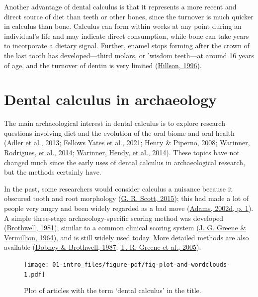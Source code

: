 \documentclass[
  letterpaper,
]{book}
\begin{document}
Another advantage of dental calculus is that it represents a more recent
and direct source of diet than teeth or other bones, since the turnover
is much quicker in calculus than bone. Calculus can form within weeks at
any point during an individual's life and may indicate direct
consumption, while bone can take years to incorporate a dietary signal.
Further, enamel stops forming after the crown of the last tooth has
developed---third molars, or 'wisdom teeth---at around 16 years of age,
and the turnover of dentin is very limited
(\protect\hyperlink{ref-hillsonDentalAnthropology1996}{Hillson, 1996}).

\hypertarget{intro-arch}{%
\section{Dental calculus in archaeology}\label{intro-arch}}

The main archaeological interest in dental calculus is to explore
research questions involving diet and the evolution of the oral biome
and oral health
(\protect\hyperlink{ref-adlerSequencingAncient2013}{Adler et al., 2013};
\protect\hyperlink{ref-yatesOralMicrobiome2021}{Fellows Yates et al.,
2021}; \protect\hyperlink{ref-henryCalculusSyria2008}{Henry \& Piperno,
2008}; \protect\hyperlink{ref-warinnerPathogensHost2014}{Warinner,
Rodrigues, et al., 2014};
\protect\hyperlink{ref-warinnerEvidenceMilk2014}{Warinner, Hendy, et
al., 2014}). These topics have not changed much since the early uses of
dental calculus in archaeological research, but the methods certainly
have.

In the past, some researchers would consider calculus a nuisance because
it obscured tooth and root morphology
(\protect\hyperlink{ref-scottBriefHistory2015}{G. R. Scott, 2015}); this
had made a lot of people very angry and been widely regarded as a bad
move (\protect\hyperlink{ref-adamsRestaurantEnd2002}{Adams, 2002d, p.
1}). A simple three-stage archaeology-specific scoring method was
developed (\protect\hyperlink{ref-brothwellDiggingBones1981}{Brothwell,
1981}), similar to a common clinical scoring system
(\protect\hyperlink{ref-greeneSimplifiedOral1964}{J. G. Greene \&
Vermillion, 1964}), and is still widely used today. More detailed
methods are also available
(\protect\hyperlink{ref-dobneyMethodEvaluating1987}{Dobney \& Brothwell,
1987}; \protect\hyperlink{ref-greeneQuantifyingCalculus2005}{T. R.
Greene et al., 2005}).

\begin{figure}

{\centering \texttt{[image: 01-intro\_files/figure-pdf/fig-plot-and-wordclouds-1.pdf]}

}

\caption{\label{fig-plot-and-wordclouds}Plot of articles with the term
`dental calculus' in the title.}

\end{figure}
\end{document}
